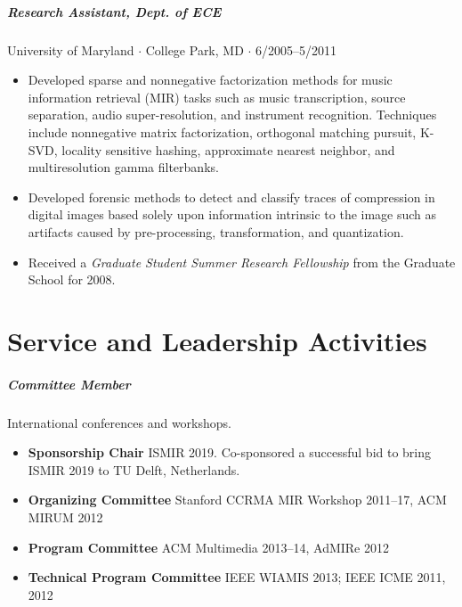\documentclass[10pt,letterpaper]{article}
\begin{document}
\subparagraph{Research Assistant, Dept. of ECE}
University of Maryland $\cdot$ College Park, MD $\cdot$ 6/2005--5/2011
\begin{itemize}
    \item Developed sparse and nonnegative factorization methods for music information retrieval (MIR) tasks such as music transcription, source separation, audio super-resolution, and instrument recognition. Techniques include nonnegative matrix factorization, orthogonal matching pursuit, K-SVD, locality sensitive hashing, approximate nearest neighbor, and multiresolution gamma filterbanks.
    \item Developed forensic methods to detect and classify traces of compression in digital images based solely upon information intrinsic to the image such as artifacts caused by pre-processing, transformation, and quantization.
    \item Received a \textit{Graduate Student Summer Research Fellowship} from the Graduate School for 2008.
\end{itemize}







\section*{Service and Leadership Activities}

\subparagraph{Committee Member} International conferences and workshops.
\begin{itemize}
    \item \textbf{Sponsorship Chair} ISMIR 2019. Co-sponsored a successful bid to bring ISMIR 2019 to TU Delft, Netherlands.
    \item \textbf{Organizing Committee} Stanford CCRMA MIR Workshop 2011--17, ACM MIRUM 2012
    \item \textbf{Program Committee} ACM Multimedia 2013--14, AdMIRe 2012
    \item \textbf{Technical Program Committee} IEEE WIAMIS 2013; IEEE ICME 2011, 2012
\end{itemize}
\end{document}
